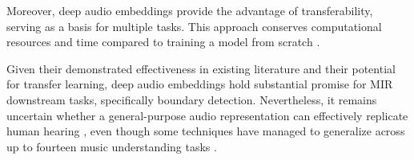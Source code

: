 Moreover, deep audio embeddings provide the advantage of transferability, serving as a basis for multiple tasks. This approach conserves computational resources and time compared to training a model from scratch \cite{HamelTransferSimilarity}.

Given their demonstrated effectiveness in existing literature and their potential for transfer learning, deep audio embeddings hold substantial promise for MIR downstream tasks, specifically boundary detection. Nevertheless, it remains uncertain whether a general-purpose audio representation can effectively replicate human hearing \cite{Turian2022HEAR:Representations}, even though some techniques have managed to generalize across up to fourteen music understanding tasks \cite{Li2023MERT:Training}.